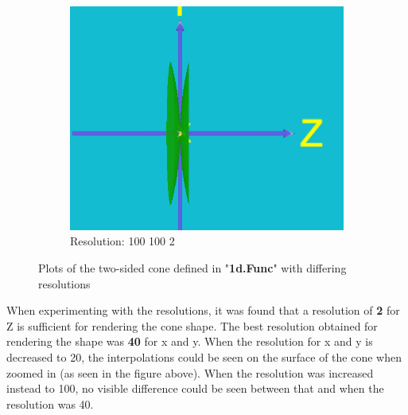 \documentclass[acmlarge,nonacm=true]{acmart}
\begin{document}
\begin{figure}[H]
\begin{subfigure}{.33\textwidth}
		\centering
		\includegraphics[width=.8\linewidth]{fig/1d100_100_2.PNG}
		\caption{Resolution: 100 100 2}
	  \end{subfigure}
	\caption{Plots of the two-sided cone defined in "\textbf{1d.Func}" with differing resolutions}
	\label{fig:1d}
\end{figure}

When experimenting with the resolutions, it was found that a resolution of \textbf{2} for Z is sufficient for rendering the 
cone shape. The best resolution obtained for rendering the shape was \textbf{40} for x and y. When the resolution for x and y
is decreased to 20, the interpolations could be seen on the surface of the cone when zoomed in (as seen in the figure above). When the resolution was 
increased instead to 100, no visible difference could be seen between that and when the resolution was 40.

\pagebreak
\end{document}
